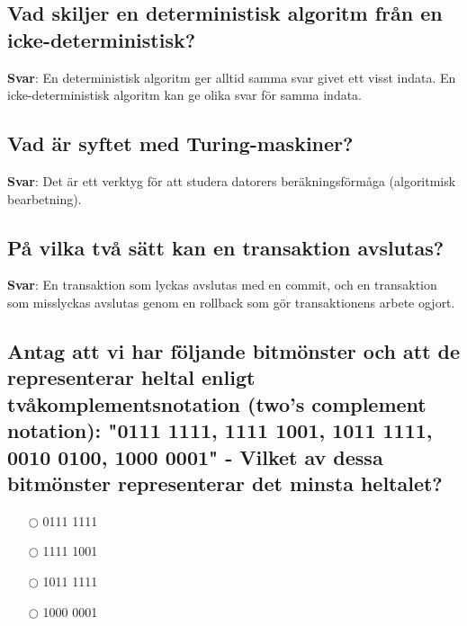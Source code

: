 \documentclass[a4paper,11pt,oneside]{article}
\begin{document}
\begin{sloppypar}
\subsection{Vad skiljer en deterministisk algoritm fr\r{a}n en icke-deterministisk?}

\label{q:344:sa:sv:True}

\textbf{Svar}: En deterministisk algoritm ger alltid samma svar givet ett visst indata. En icke-deterministisk algoritm kan ge olika svar f\"or samma indata.



\subsection{Vad \"ar syftet med Turing-maskiner?}

\label{q:345:sa:sv:True}

\textbf{Svar}: Det \"ar ett verktyg f\"or att studera datorers ber\"akningsf\"orm\r{a}ga (algoritmisk bearbetning).



\subsection{P\r{a} vilka tv\r{a} s\"att kan en transaktion avslutas?}

\label{q:346:sa:sv:True}

\textbf{Svar}: En transaktion som lyckas avslutas med en commit, och en transaktion som misslyckas avslutas genom en rollback som g\"or transaktionens arbete ogjort.



\subsection{Antag att vi har f\"oljande bitm\"onster och att de representerar heltal enligt tv\r{a}komplementsnotation (two{\textquoteright}s complement notation): "0111 1111, 1111 1001, 1011 1111, 0010 0100, 1000 0001" - Vilket av dessa bitm\"onster representerar det minsta heltalet?}

\label{q:34800:mc:sv:True}

\begin{itemize}
  \item[$\bigcirc$] 0111 1111
  \item[$\bigcirc$] 1111 1001
  \item[$\bigcirc$] 1011 1111
  \item[$\bigcirc$] 1000 0001
\end{itemize}


\end{sloppypar}
\end{document}
